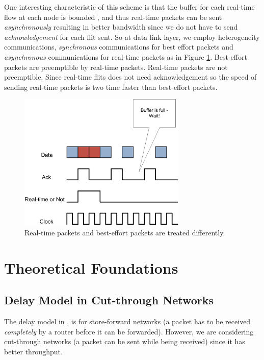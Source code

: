 \documentclass[conference, twocolumn]{IEEEtran}
\theoremstyle{definition}
\begin{document}
One interesting characteristic of this scheme is that the buffer for each 
real-time flow at each node is bounded \cite{Ferrari90ascheme}, and thus
real-time packets can be sent {\em asynchronously} resulting in better bandwidth
since we do not have to send {\em acknowledgement} for each flit sent. So at
data link layer, we employ heterogeneity communications, {\em synchronous}
communications for best effort packets and {\em asynchronous} communications
for real-time packets as in Figure \ref{fig:HeteroComm}. Best-effort packets
are preemptible by real-time packets. Real-time packets are not preemptible.
Since real-time flits does not need acknowledgement so the speed of sending
real-time packets is two time faster than best-effort packets.


\begin{figure}[htbp]
\centering
\includegraphics[width=8cm]{pics/HeteroComm.png}
\caption[Heterogeneous Communication for Packets.]
{Real-time packets and best-effort packets are treated
differently.}\label{fig:HeteroComm}
\end{figure}

\section{Theoretical Foundations}
\subsection{Delay Model in Cut-through Networks}

The delay model in \cite{Ferrari90ascheme}, \cite{VermaJitter91} is
for store-forward networks \cite{DallyPrinNetwork} (a packet has to be
received {\em completely} by a router before it can be forwarded). However, we
are considering cut-through networks (a packet can be sent while being
received) since it has better throughput.
\end{document}

